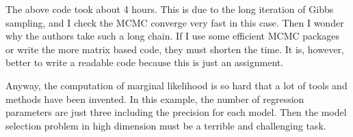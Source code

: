\documentclass{article}
\begin{document}
\par
The above code took about 4 hours. This is due to the long iteration of Gibbs sampling, and I check the MCMC converge very fast in this case. Then I wonder why the authors take such a long chain. If I use some efficient MCMC packages or write the more matrix based code, they must shorten the time. It is, however, better to write a readable code because this is just an assignment.
\par
Anyway, the computation of marginal likelihood is so hard that a lot of tools and methods have been invented. In this example, the number of regression parameters are just three including the precision for each model. Then the model selection problem in high dimension must be a terrible and challenging task.
\end{document}
